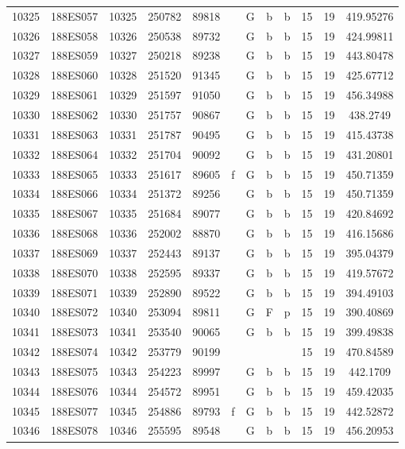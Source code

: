 \begin{tabular}{|*{12}{c|}}
10325 & 188ES057 & 10325 & 250782 & 89818 &  & G & b & b & 15 & 19 & 419.95276 \\ 
10326 & 188ES058 & 10326 & 250538 & 89732 &  & G & b & b & 15 & 19 & 424.99811 \\ 
10327 & 188ES059 & 10327 & 250218 & 89238 &  & G & b & b & 15 & 19 & 443.80478 \\ 
10328 & 188ES060 & 10328 & 251520 & 91345 &  & G & b & b & 15 & 19 & 425.67712 \\ 
10329 & 188ES061 & 10329 & 251597 & 91050 &  & G & b & b & 15 & 19 & 456.34988 \\ 
10330 & 188ES062 & 10330 & 251757 & 90867 &  & G & b & b & 15 & 19 & 438.2749 \\ 
10331 & 188ES063 & 10331 & 251787 & 90495 &  & G & b & b & 15 & 19 & 415.43738 \\ 
10332 & 188ES064 & 10332 & 251704 & 90092 &  & G & b & b & 15 & 19 & 431.20801 \\ 
10333 & 188ES065 & 10333 & 251617 & 89605 & f & G & b & b & 15 & 19 & 450.71359 \\ 
10334 & 188ES066 & 10334 & 251372 & 89256 &  & G & b & b & 15 & 19 & 450.71359 \\ 
10335 & 188ES067 & 10335 & 251684 & 89077 &  & G & b & b & 15 & 19 & 420.84692 \\ 
10336 & 188ES068 & 10336 & 252002 & 88870 &  & G & b & b & 15 & 19 & 416.15686 \\ 
10337 & 188ES069 & 10337 & 252443 & 89137 &  & G & b & b & 15 & 19 & 395.04379 \\ 
10338 & 188ES070 & 10338 & 252595 & 89337 &  & G & b & b & 15 & 19 & 419.57672 \\ 
10339 & 188ES071 & 10339 & 252890 & 89522 &  & G & b & b & 15 & 19 & 394.49103 \\ 
10340 & 188ES072 & 10340 & 253094 & 89811 &  & G & F & p & 15 & 19 & 390.40869 \\ 
10341 & 188ES073 & 10341 & 253540 & 90065 &  & G & b & b & 15 & 19 & 399.49838 \\ 
10342 & 188ES074 & 10342 & 253779 & 90199 &  &  &  &  & 15 & 19 & 470.84589 \\ 
10343 & 188ES075 & 10343 & 254223 & 89997 &  & G & b & b & 15 & 19 & 442.1709 \\ 
10344 & 188ES076 & 10344 & 254572 & 89951 &  & G & b & b & 15 & 19 & 459.42035 \\ 
10345 & 188ES077 & 10345 & 254886 & 89793 & f & G & b & b & 15 & 19 & 442.52872 \\ 
10346 & 188ES078 & 10346 & 255595 & 89548 &  & G & b & b & 15 & 19 & 456.20953 \\ 

\end{tabular}

